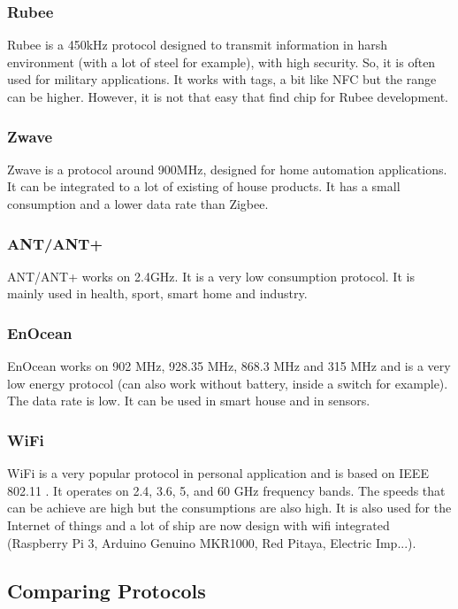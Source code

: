 \subsubsection{Rubee}

Rubee is a 450kHz protocol designed to transmit information in harsh environment (with a lot of steel for example), with high security. So, it is often used for military applications. It works with tags, a bit like NFC but the range can be higher. However, it is not that easy that find chip for Rubee development.

\subsubsection{Zwave}

Zwave is a protocol around 900MHz, designed for home automation applications. It can be integrated to a lot of existing of house products. It has a small consumption and a lower data rate than Zigbee.

\subsubsection{ANT/ANT+}

ANT/ANT+ works on 2.4GHz. It is a very low consumption protocol. It is mainly used in health, sport, smart home and industry.

\subsubsection{EnOcean}

EnOcean works on 902 MHz, 928.35 MHz, 868.3 MHz and 315 MHz and is a very low energy protocol (can also work without battery, inside a switch for example). The data rate is low. It can be used in smart house and in sensors.

\subsubsection{WiFi}

WiFi is a very popular protocol in personal application and is based on IEEE 802.11 . It operates on 2.4, 3.6, 5, and 60 GHz frequency bands. The speeds that can be achieve are high but the consumptions are also high. It is also used for the Internet of things and a lot of ship are now design with wifi integrated (Raspberry Pi 3, Arduino Genuino MKR1000, Red Pitaya, Electric Imp...).

\subsection{Comparing Protocols}


